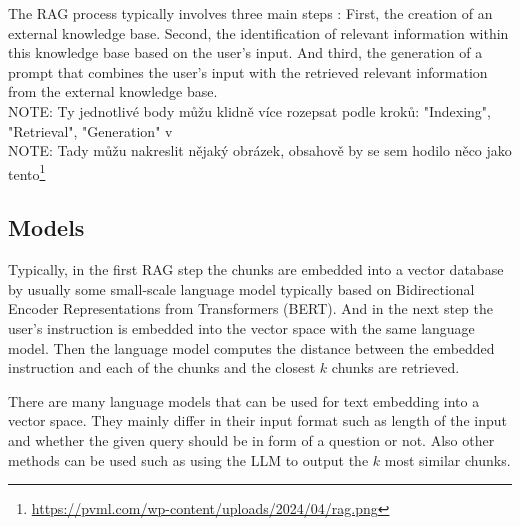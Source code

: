 The RAG process typically involves three main steps \cite{Gao2023}: First, the creation of an external knowledge base. Second, the identification of relevant information within this knowledge base based on the user's input. And third, the generation of a prompt that combines the user's input with the retrieved relevant information from the external knowledge base. \\

NOTE: Ty jednotlivé body můžu klidně více rozepsat podle kroků: "Indexing", "Retrieval", "Generation" v \cite{Gao2023} \\

NOTE: Tady můžu nakreslit nějaký obrázek, obsahově by se sem hodilo něco jako tento\footnote{\url{https://pvml.com/wp-content/uploads/2024/04/rag.png}}


\subsection{Models}

Typically, in the first RAG step the chunks are embedded into a vector database by usually some small-scale language model typically based on Bidirectional Encoder Representations from Transformers (BERT). And in the next step the user's instruction is embedded into the vector space with the same language model. Then the language model computes the distance between the embedded instruction and each of the chunks and the closest $k$ chunks are retrieved.

There are many language models that can be used for text embedding into a vector space. They mainly differ in their input format such as length of the input and whether the given query should be in form of a question or not. Also other methods can be used such as using the LLM to output the $k$ most similar chunks.
